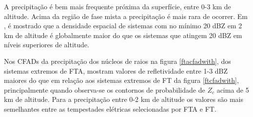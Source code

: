 




A precipitação é bem mais frequente próxima da superfície, entre 0-3 km de altitude. Acima da região de fase mista a precipitação é mais rara de ocorrer. Em \cite{liu2008}, é mostrado que a densidade espacial de sistemas com no mínimo 20 dBZ em 2 km de altitude é globalmente maior do que os sistemas que atingem 20 dBZ em níveis superiores de altitude.




Nos CFADs da precipitação dos núcleos de raios na figura \ref{ftacfadwith}, dos sistemas extremos de FTA, mostram valores de refletividade entre 1-3 dBZ maiores do que em relação aos sistemas extremos de FT da figura \ref{ftcfadwith}, principalmente quando observa-se os contornos de probabilidade de $Z_c$ acima de 5 km de altitude. Para a precipitação entre 0-2 km de altitude os valores são mais semelhantes entre as tempestades elétricas selecionadas por FTA e FT. 

